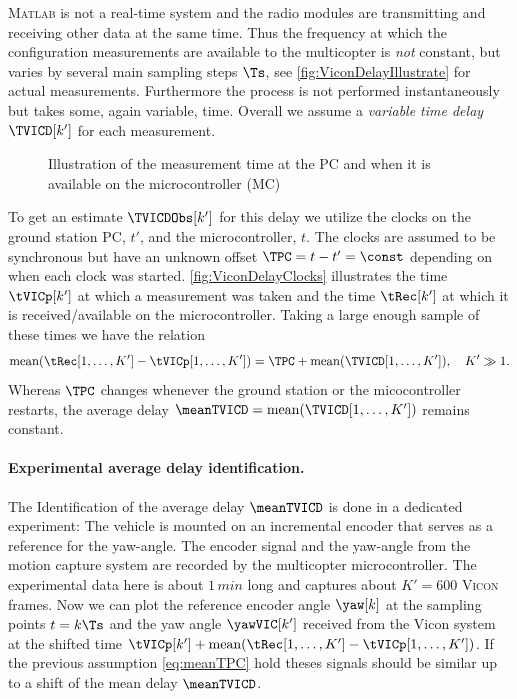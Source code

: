 \textsc{Matlab} is not a real-time system and the radio modules are transmitting and receiving other data at the same time.
Thus the frequency at which the configuration measurements are available to the multicopter is \textit{not} constant, but varies by several main sampling steps $\Ts$, see \autoref{fig:ViconDelayIllustrate} for actual measurements.
Furthermore the process is not performed instantaneously but takes some, again variable, time. 
Overall we assume a \textit{variable time delay} $\TVICD[k']$ for each measurement.

\begin{figure}[htb]
 \centering
 
 \caption{Illustration of the measurement time at the PC and when it is available on the microcontroller (MC)}
 \label{fig:ViconDelayClocks}
\end{figure}

To get an estimate $\TVICDObs[k']$ for this delay we utilize the clocks on the ground station PC, $t'$, and the microcontroller, $t$.
The clocks are assumed to be synchronous but have an unknown offset $\TPC = t - t' = \const$ depending on when each clock was started.
\autoref{fig:ViconDelayClocks} illustrates the time $\tVICp[k']$ at which a measurement was taken and the time $\tRec[k']$ at which it is received/available on the microcontroller.
Taking a large enough sample of these times we have the relation
\begin{align}\label{eq:meanTPC}
 \text{mean} (\tRec[1,\ldots,K'] - \tVICp[1,\ldots,K']) = \TPC + \text{mean}(\TVICD[1,\ldots,K']), \quad K'\gg 1.
\end{align}
Whereas $\TPC$ changes whenever the ground station or the micocontroller restarts, the average delay $\meanTVICD = \text{mean}(\TVICD[1,\ldots,K'])$ remains constant.

\paragraph{Experimental average delay identification.}
The Identification of the average delay $\meanTVICD$ is done in a dedicated experiment:
The vehicle is mounted on an incremental encoder that serves as a reference for the yaw-angle.
The encoder signal and the yaw-angle from the motion capture system are recorded by the multicopter microcontroller.
The experimental data here is about $1\,\unit{min}$ long and captures about $K' = 600$ \textsc{Vicon} frames.
Now we can plot the reference encoder angle $\yaw[k]$ at the sampling points $t = k\Ts$ and the yaw angle $\yawVIC[k']$ received from the Vicon system at the shifted time $\tVICp[k'] + \text{mean}(\tRec[1,\ldots,K'] - \tVICp[1,\ldots,K'])$.
If the previous assumption \eqref{eq:meanTPC} hold theses signals should be similar up to a shift of the mean delay $\meanTVICD$.

